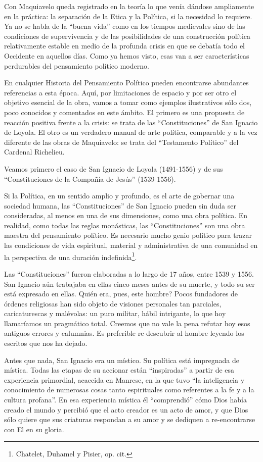 \documentclass[
]{book}
\begin{document}
Con Maquiavelo queda registrado en la teoría lo que venía dándose ampliamente en la práctica: la separación de la Etica y la Política, si la necesidad lo requiere. Ya no se habla de la ``buena vida'' como en los tiempos medievales sino de las condiciones de supervivencia y de las posibilidades de una construcción política relativamente estable en medio de la profunda crisis en que se debatía todo el Occidente en aquellos días. Como ya hemos visto, esas van a ser características perdurables del pensamiento político moderno.

En cualquier Historia del Pensamiento Político pueden encontrarse abundantes referencias a esta época. Aquí, por limitaciones de espacio y por ser otro el objetivo esencial de la obra, vamos a tomar como ejemplos ilustrativos sólo dos, poco conocidos y comentados en este ámbito. El primero es una propuesta de reacción positiva frente a la crisis: se trata de las ``Constituciones'' de San Ignacio de Loyola. El otro es un verdadero manual de arte política, comparable y a la vez diferente de las obras de Maquiavelo: se trata del ``Testamento Político'' del Cardenal Richelieu.

Veamos primero el caso de San Ignacio de Loyola (1491-1556) y de sus ``Constituciones de la Compañía de Jesús'' (1539-1556).

Si la Política, en un sentido amplio y profundo, es el arte de gobernar una sociedad humana, las ``Constituciones'' de San Ignacio pueden sin duda ser consideradas, al menos en una de sus dimensiones, como una obra política. En realidad, como todas las reglas monásticas, las ``Constituciones'' son una obra maestra del pensamiento político. Es necesario mucho genio político para trazar las condiciones de vida espiritual, material y administrativa de una comunidad en la perspectiva de una duración indefinida\footnote{Chatelet, Duhamel y Pisier, op. cit.}.

Las ``Constituciones'' fueron elaboradas a lo largo de 17 años, entre 1539 y 1556. San Ignacio aún trabajaba en ellas cinco meses antes de su muerte, y todo su ser está expresado en ellas. Quién era, pues, este hombre? Pocos fundadores de órdenes religiosas han sido objeto de visiones personales tan parciales, caricaturescas y malévolas: un puro militar, hábil intrigante, lo que hoy llamaríamos un pragmático total. Creemos que no vale la pena refutar hoy esos antiguos errores y calumnias. Es preferible re-descubrir al hombre leyendo los escritos que nos ha dejado.

Antes que nada, San Ignacio era un místico. Su política está impregnada de mística. Todas las etapas de su accionar están ``inspiradas'' a partir de esa experiencia primordial, acaecida en Manrese, en la que tuvo ``la inteligencia y conocimiento de numerosas cosas tanto espirituales como referentes a la fe y a la cultura profana''. En esa experiencia mística él ``comprendió'' cómo Dios había creado el mundo y percibió que el acto creador es un acto de amor, y que Dios sólo quiere que sus criaturas respondan a su amor y se dediquen a re-encontrarse con El en su gloria.
\end{document}
